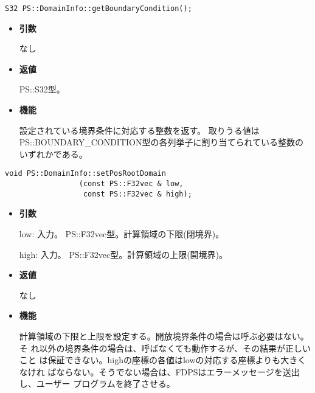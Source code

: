 
\begin{screen}
\begin{verbatim}
S32 PS::DomainInfo::getBoundaryCondition();
\end{verbatim}
\end{screen}

\begin{itemize}

\item {\bf 引数}

なし

\item {\bf 返値}

PS::S32型。

\item {\bf 機能}

設定されている境界条件に対応する整数を返す。
取りうる値はPS::BOUNDARY\_CONDITION型の各列挙子に割り当てられている整数のいずれかである。

\end{itemize}


\begin{screen}
\begin{verbatim}
void PS::DomainInfo::setPosRootDomain
                 (const PS::F32vec & low,
                  const PS::F32vec & high);
\end{verbatim}
\end{screen}

\begin{itemize}

\item {\bf 引数}

low: 入力。 PS::F32vec型。計算領域の下限(閉境界)。

high: 入力。 PS::F32vec型。計算領域の上限(開境界)。

\item {\bf 返値}

なし

\item {\bf 機能}

計算領域の下限と上限を設定する。開放境界条件の場合は呼ぶ必要はない。そ
れ以外の境界条件の場合は、呼ばなくても動作するが、その結果が正しいこと
は保証できない。highの座標の各値はlowの対応する座標よりも大きくなけれ
ばならない。そうでない場合は、FDPSはエラーメッセージを送出し、ユーザー
プログラムを終了させる。

\end{itemize}


